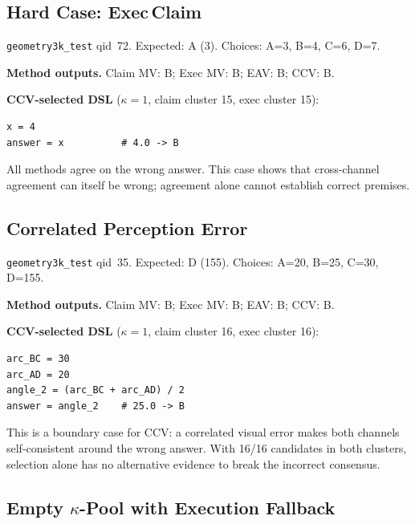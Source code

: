 \documentclass{article}
\newcommand{\ccv}{\textsc{CCV}}
\begin{document}
\subsection{Hard Case: Exec\,Claim}

\texttt{geometry3k\_test} qid~72. Expected: A (3). Choices: A=3, B=4, C=6, D=7.

\smallskip
\noindent \textbf{Method outputs.} Claim MV: B; Exec MV: B; EAV: B; \ccv{}: B.
\smallskip

\begin{minipage}{\linewidth}
\noindent \textbf{CCV-selected DSL} ($\kappa=1$, claim cluster 15, exec cluster 15):
\begin{verbatim}
x = 4
answer = x          # 4.0 -> B
\end{verbatim}
\end{minipage}

All methods agree on the wrong answer. This case shows that cross-channel agreement can itself be wrong; agreement alone cannot establish correct premises.

\subsection{Correlated Perception Error}

\texttt{geometry3k\_test} qid~35. Expected: D (155). Choices: A=20, B=25, C=30, D=155.

\smallskip
\noindent \textbf{Method outputs.} Claim MV: B; Exec MV: B; EAV: B; \ccv{}: B.
\smallskip

\begin{minipage}{\linewidth}
\noindent \textbf{CCV-selected DSL} ($\kappa=1$, claim cluster 16, exec cluster 16):
\begin{verbatim}
arc_BC = 30
arc_AD = 20
angle_2 = (arc_BC + arc_AD) / 2
answer = angle_2    # 25.0 -> B
\end{verbatim}
\end{minipage}

This is a boundary case for \ccv{}: a correlated visual error makes both channels self-consistent around the wrong answer. With 16/16 candidates in both clusters, selection alone has no alternative evidence to break the incorrect consensus.

\subsection{Empty $\kappa$-Pool with Execution Fallback}
\end{document}
